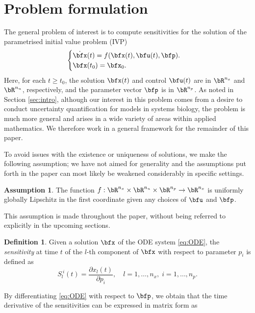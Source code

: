 \documentclass[DIV=12]{scrartcl} %
\theoremstyle{definition}
\newtheorem{definition}{Definition}
\newtheorem*{assumption*}{Assumption}
\begin{document}
\section{Problem formulation}
\label{sec:problem}

The general problem of interest is to compute sensitivities for the solution of the parametrised initial value problem (IVP) %
\begin{equation}
\label{eq:ODE}
\begin{cases}
\dot{\bfx}(t) = f(\bfx(t),\bfu(t),\bfp).\\
\bfx(t_0) = \bfx_0.
\end{cases}    
\end{equation}
Here, for each $t \geq t_0$, the solution $\bfx (t)$ and control $\bfu (t)$ are in $\bR ^{n_x}$ and $\bR ^{n_u}$, respectively, and the parameter vector $\bfp$ is in $\bR ^{n_p}$. As noted in Section \ref{sec:intro}, although our interest in this problem comes from a desire to conduct uncertainty quantification for models in systems biology, the problem is much more general and arises in a wide variety of areas within applied mathematics. We therefore work in a general framework for the remainder of this paper. 

To avoid issues with the existence or uniqueness of solutions, we make the following assumption; we have not aimed for generality and the assumptions put forth in the paper can most likely be weakened considerably in specific settings.
\begin{assumption*}
The function $f: \bR ^{n_x} \times \bR ^{n_u} \times \bR ^{n_p} \to \bR ^{n_x}$ is uniformly globally Lipschitz in the first coordinate given any choices of $\bfu$ and $\bfp$.
\end{assumption*}
This assumption is made throughout the paper, without being referred to explicitly in the upcoming sections.

\begin{definition}
Given a solution $\bfx$ of the ODE system \eqref{eq:ODE}, the \textit{sensitivity} at time $t$ of the $l$-th component of $\bfx$ with respect to parameter $p_i$ is defined as
\begin{equation}
  S_{l}^{~i}(t)=\frac{\partial x_l(t)}{\partial p_i},\quad l=1,\dots,n_x,\;i=1,\dots,n_p.\label{eq:Sli}
\end{equation}
\end{definition}
By differentiating \eqref{eq:ODE} with respect to $\bfp$, we obtain that the time derivative of the sensitivities can be expressed in matrix form as 
\end{document}
